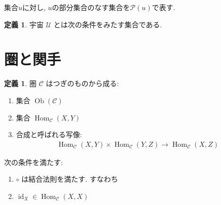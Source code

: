 \documentclass[a5paper, dvipdfmx]{jsbook}
\theoremstyle{definition}
\newtheorem{Definition}[Axiom]{定義}
\newcommand{\mcal}{\mathcal}
\newcommand{\id}{\mathop{\mathrm{id}}\nolimits} %
\newcommand{\Ob}{\mathop{\mathrm{Ob}}\nolimits}
\numberwithin{equation}{section} %
\newcommand{\Hom}{\mathop{\mathrm{Hom}}\nolimits}
\begin{document}
集合$u$に対し, $u$の部分集合のなす集合を$\mcal{P}(u)$で表す. 

\begin{Definition}
  宇宙 $\mcal{U}$ とは次の条件をみたす集合である. 
\end{Definition}

\section{圏と関手}

\begin{Definition}
  圏 $\mcal{C}$ はつぎのものから成る: 
  \begin{enumerate}
  \renewcommand{\labelenumi}{(\roman{enumi})}
    \item 集合 $\Ob(\mcal{C})$
    \item 集合 $\Hom_\mcal{C}(X,Y)$
    \item 合成と呼ばれる写像: \begin{align*}
      \Hom_\mcal{C}(X,Y) \times \Hom_\mcal{C}(Y,Z) 
      \to \Hom_\mcal{C}(X,Z)
    \end{align*}
  \end{enumerate}
  次の条件を満たす: 
  \begin{enumerate}
  \renewcommand{\labelenumi}{(\alph{enumi})}
    \item $\circ$ は結合法則を満たす. すなわち
    \item $\id_X \in \Hom_\mcal{C}(X,X)$
  \end{enumerate}
\end{Definition}
\end{document}
